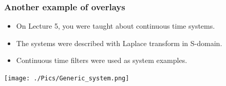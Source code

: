 \documentclass[logo=bluequo,normaltitle]{aaltoslides}
\begin{document}
\begin{frame}[t]
\begin{minipage}{.48\linewidth}
\begin{center}
            \end{center}
\end{minipage}
\end{frame}

\begin{frame}[t]
    \frametitle{Another example of overlays}
    \begin{centering}
    \end{centering}
    \begin{itemize}
        \item<1-> On Lecture  5, you were taught about continuous time systems.
        \item<2-> The systems were described with Laplace transform in S-domain.
        \item<3-> Continuous time filters were used as system examples.
    \end{itemize}
    \begin{centering}
        \texttt{[image: ./Pics/Generic\_system.png]}\
    \end{centering}
\end{frame}
\end{document}

